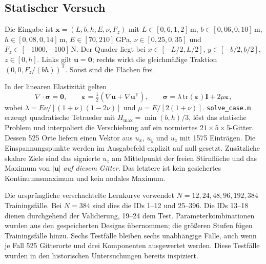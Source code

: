 \documentclass[11pt,a4paper]{article}
\begin{document}
\subsection{Statischer Versuch}
Die Eingabe ist $\boldsymbol{x}=(L,b,h,E,\nu,F_z)$ mit $L\in[0{,}6,1{,}2]$\,m, $b\in[0{,}06,0{,}10]$\,m, $h\in[0{,}08,0{,}14]$\,m, $E\in[70,210]$\,GPa, $\nu\in[0{,}25,0{,}35]$ und $F_z\in[-1000,-100]$\,N. Der Quader liegt bei $x\in[-L/2,L/2]$, $y\in[-b/2,b/2]$, $z\in[0,h]$. Links gilt $\boldsymbol u=\boldsymbol0$; rechts wirkt die gleichmäßige Traktion $(0,0,F_z/(bh))^\mathsf T$. Sonst sind die Flächen frei.

In der linearen Elastizität gelten
\begin{equation}
 \nabla\!\cdot\boldsymbol\sigma=\boldsymbol0,\qquad
 \boldsymbol\varepsilon=\tfrac12(\nabla\boldsymbol u+\nabla\boldsymbol u^\mathsf T),\qquad
 \boldsymbol\sigma=\lambda\,\mathrm{tr}(\boldsymbol\varepsilon)\boldsymbol I+2\mu\boldsymbol\varepsilon,
\end{equation}
wobei $\lambda=E\nu/[(1+\nu)(1-2\nu)]$ und $\mu=E/[2(1+\nu)]$. \texttt{solve\_case.m} erzeugt quadratische Tetraeder mit $H_{\max}=\min(b,h)/3$, löst das statische Problem und interpoliert die Verschiebung auf ein normiertes $21\times5\times5$-Gitter. Dessen 525 Orte liefern einen Vektor aus $u_x$, $u_y$ und $u_z$ mit 1575 Einträgen. Die Einspannungspunkte werden im Ausgabefeld explizit auf null gesetzt. Zusätzliche skalare Ziele sind das signierte $u_z$ am Mittelpunkt der freien Stirnfläche und das Maximum von $|\boldsymbol u|$ \emph{auf diesem Gitter}. Das letztere ist kein gesichertes Kontinuumsmaximum und kein nodales Maximum.

Die ursprüngliche verschachtelte Lernkurve verwendet $N=12,24,48,96,192,384$ Trainingsfälle. Bei $N=384$ sind dies die IDs 1--12 und 25--396. Die IDs 13--18 dienen durchgehend der Validierung, 19--24 dem Test. Parameterkombinationen wurden aus den gespeicherten Designs übernommen; die größeren Stufen fügen Trainingsfälle hinzu. Sechs Testfälle bleiben sechs unabhängige Fälle, auch wenn je Fall 525 Gitterorte und drei Komponenten ausgewertet werden. Diese Testfälle wurden in den historischen Untersuchungen bereits inspiziert.
\end{document}
